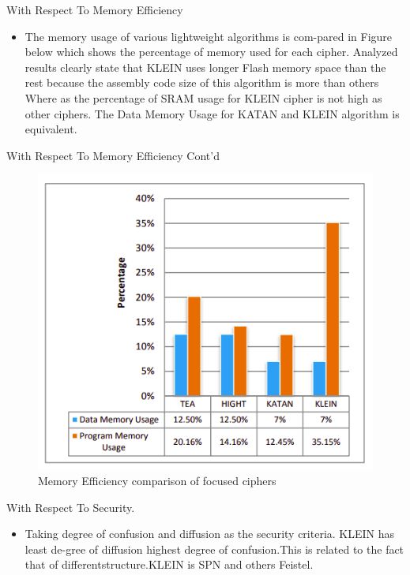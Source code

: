 \begin{frame}{With Respect To Memory Efficiency}
	\begin{itemize}
		\item The memory usage of various lightweight algorithms is com-pared in Figure below which shows the percentage of memory used for each cipher. Analyzed results clearly state that KLEIN uses longer Flash memory space than the rest because the assembly code size of this algorithm is more than others Where as the percentage of SRAM usage for KLEIN cipher is not high as other ciphers. The Data Memory Usage for KATAN and KLEIN algorithm is equivalent.
	\end{itemize}
\end{frame}

\begin{frame}{With Respect To Memory Efficiency Cont'd}
	\begin{itemize}
    \begin{figure}
    \centering
    \includegraphics[width= 75 mm]{Pics/DM.png} 
    \caption{Memory Efficiency comparison of focused ciphers}
    \label{fig:6distinguisher}
\end{figure} 
	\end{itemize}
\end{frame}

\begin{frame}{With Respect To Security.}
	\begin{itemize}
		\item Taking degree of confusion and diffusion as the security criteria. KLEIN has least de-gree of diffusion highest degree of confusion.This is related to the fact that of differentstructure.KLEIN is SPN and others Feistel.
	\end{itemize}
\end{frame}

